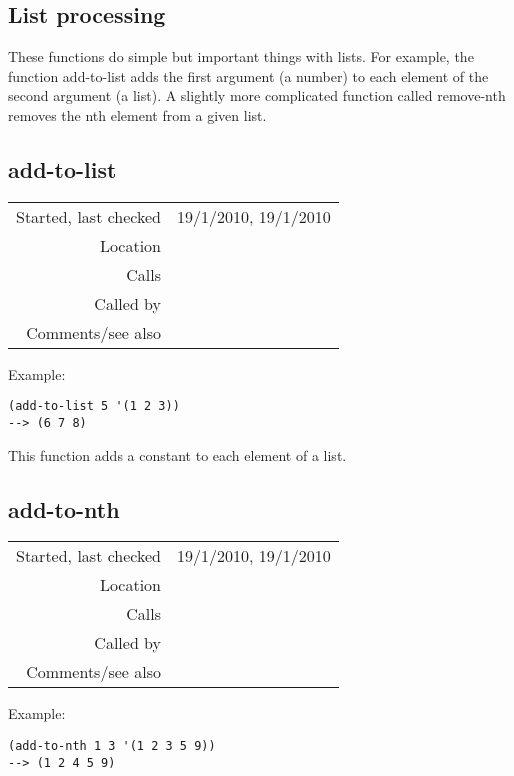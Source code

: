 \subsection{List processing}\label{sec:list-processing}

These functions do simple but important things with
lists. For example, the function add-to-list adds the
first argument (a number) to each element of the
second argument (a list). A slightly more complicated
function called remove-nth removes the nth element
from a given list.


\subsection*{add-to-list}\label{fun:add-to-list}

\vspace{0.3cm}
\begin{tabular}{r|p{8cm}}
Started, last checked & 19/1/2010, 19/1/2010 \\
Location & \nameref{sec:list-processing} \\
Calls & \\
Called by & \\
Comments/see also & 
\end{tabular}

\vspace{0.5cm}
\noindent Example:
\begin{verbatim}
(add-to-list 5 '(1 2 3))
--> (6 7 8)
\end{verbatim}

\noindent This function adds a constant to each
element of a list.


\subsection*{add-to-nth}\label{fun:add-to-nth}

\vspace{0.3cm}
\begin{tabular}{r|p{8cm}}
Started, last checked & 19/1/2010, 19/1/2010 \\
Location & \nameref{sec:list-processing} \\
Calls & \nameref{fun:firstn} \\
Called by & \\
Comments/see also & 
\end{tabular}

\vspace{0.5cm}
\noindent Example:
\begin{verbatim}
(add-to-nth 1 3 '(1 2 3 5 9))
--> (1 2 4 5 9)
\end{verbatim}

